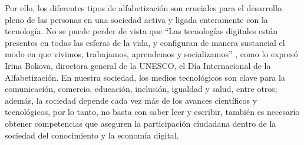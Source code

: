 \documentclass{textolivre}
\begin{document}
Por ello, los diferentes tipos de alfabetización son cruciales para el desarrollo pleno de las personas en una sociedad activa y ligada enteramente con la tecnología. No se puede perder de vista que “Las tecnologías digitales están presentes en todas las esferas de la vida, y configuran de manera sustancial el modo en que vivimos, trabajamos, aprendemos y socializamos” \cite[párr. 4]{unesco_alfabetizacion_2017}, como lo expresó Irina Bokova, directora general de la UNESCO, el Día Internacional de la Alfabetización.
En nuestra sociedad, los medios tecnológicos son clave para la comunicación, comercio, educación, inclusión, igualdad y salud, entre otros; además, la sociedad depende cada vez más de los avances científicos y tecnológicos, por lo tanto, no basta con saber leer y escribir, también es necesario obtener competencias que aseguren la participación ciudadana dentro de la sociedad del conocimiento y la economía digital.

\printbibliography\label{sec-bib}
\end{document}
